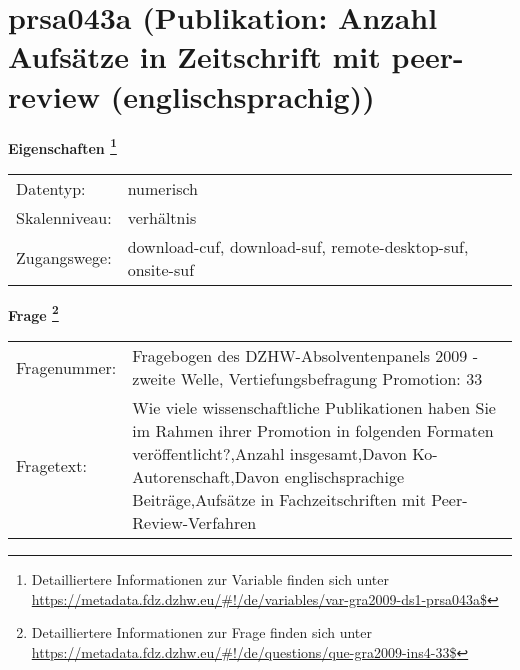 
    \setcounter{footnote}{0}

    \vspace*{-1.8cm}
	\section{prsa043a (Publikation: Anzahl Aufsätze in Zeitschrift mit peer-review (englischsprachig))}
	\label{section:prsa043a}



    \vspace*{0.5cm}
    \noindent\textbf{Eigenschaften
	\footnote{Detailliertere Informationen zur Variable finden sich unter
		\url{https://metadata.fdz.dzhw.eu/\#!/de/variables/var-gra2009-ds1-prsa043a$}}}\\
	\begin{tabularx}{\hsize}{@{}lX}
	Datentyp: & numerisch \\
	Skalenniveau: & verhältnis \\
	Zugangswege: &
	  download-cuf, 
	  download-suf, 
	  remote-desktop-suf, 
	  onsite-suf
 \\
    \end{tabularx}



				\vspace*{0.5cm}
                \noindent\textbf{Frage
	                \footnote{Detailliertere Informationen zur Frage finden sich unter
		              \url{https://metadata.fdz.dzhw.eu/\#!/de/questions/que-gra2009-ins4-33$}}}\\
				\begin{tabularx}{\hsize}{@{}lX}
					Fragenummer: &
					  Fragebogen des DZHW-Absolventenpanels 2009 - zweite Welle, Vertiefungsbefragung Promotion:
					  33
 \\
					Fragetext: & Wie viele wissenschaftliche Publikationen haben Sie im Rahmen ihrer Promotion in folgenden Formaten veröffentlicht?,Anzahl insgesamt,Davon Ko-Autorenschaft,Davon englischsprachige Beiträge,Aufsätze in Fachzeitschriften mit Peer-Review-Verfahren \\
				\end{tabularx}





